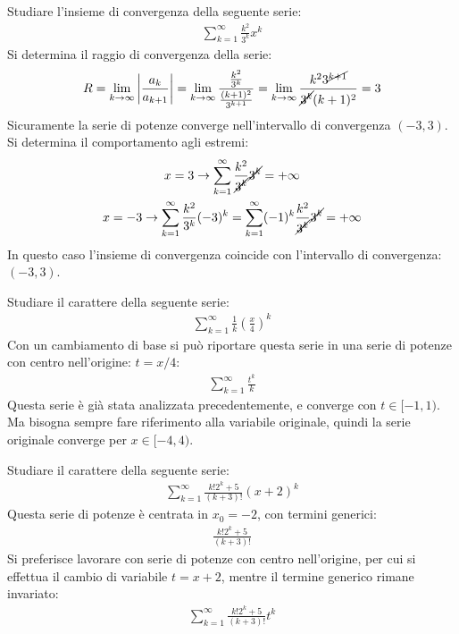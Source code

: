 \documentclass{article}
\numberwithin{equation}{subsection}
\begin{document}
Studiare l'insieme di convergenza della seguente serie:
\begin{gather*}
    \displaystyle\sum_{k=1}^\infty\frac{k^2}{3^k}x^k
\end{gather*}
Si determina il raggio di convergenza della serie:
\begin{gather*}
    R=\lim_{k\to\infty}\left|\frac{a_k}{{a_{k+1}}}\right|=
    \lim_{k\to\infty}\frac{\frac{k^2}{3^k}}{\frac{(k+1)^2}{3^{k+1}}}=
    \lim_{k\to\infty}\frac{k^23^{\cancel{k+1}}}{\cancel{3^k}(k+1)^2}=3
\end{gather*}
Sicuramente la serie di potenze converge nell'intervallo di convergenza $(-3, 3)$. Si determina il comportamento agli estremi:
\begin{gather*}
    x=3\rightarrow\displaystyle\sum_{k=1}^\infty\frac{k^2}{\cancel{3^k}}\cancel{3^k}=+\infty\\
    x=-3\rightarrow\displaystyle\sum_{k=1}^\infty\frac{k^2}{3^k}(-3)^k=
    \sum_{k=1}^\infty(-1)^k\frac{k^2}{\cancel{3^k}}\cancel{3^k}=+\infty
\end{gather*}
In questo caso l'insieme di convergenza coincide con l'intervallo di convergenza: $(-3, 3)$. 



Studiare il carattere della seguente serie:
\begin{gather*}
    \displaystyle\sum_{k=1}^\infty\frac{1}{k}\left(\frac{x}{4}\right)^k
\end{gather*}
Con un cambiamento di base si può riportare questa serie in una serie di potenze con centro nell'origine: $t=x/4$:
\begin{gather*}
    \displaystyle\sum_{k=1}^\infty\frac{t^k}{k}
\end{gather*}
Questa serie è già stata analizzata precedentemente, e converge con $t\in[-1,1)$. Ma bisogna sempre fare riferimento alla variabile originale, quindi la serie originale converge per $x\in[-4, 4)$. 


Studiare il carattere della seguente serie:
\begin{gather*}
    \displaystyle\sum_{k=1}^\infty\frac{k!2^k+5}{(k+3)!}(x+2)^k
\end{gather*}
Questa serie di potenze è centrata in $x_0=-2$, con termini generici:
\begin{gather*}
    \displaystyle\frac{k!2^k+5}{(k+3)!}
\end{gather*}
Si preferisce lavorare con serie di potenze con centro nell'origine, per cui si effettua il cambio di variabile $t=x+2$, mentre il termine generico rimane invariato:
\begin{gather*}
    \displaystyle\sum_{k=1}^\infty\frac{k!2^k+5}{(k+3)!}t^k
\end{gather*}
\end{document}
